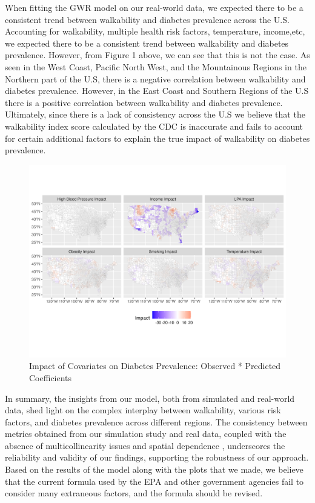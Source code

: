 \documentclass[
]{article}
\begin{document}
When fitting the GWR model on our real-world data, we expected there to
be a consistent trend between walkability and diabetes prevalence across
the U.S. Accounting for walkability, multiple health risk factors,
temperature, income,etc, we expected there to be a consistent trend
between walkability and diabetes prevalence. However, from Figure 1
above, we can see that this is not the case. As seen in the West Coast,
Pacific North West, and the Mountainous Regions in the Northern part of
the U.S, there is a negative correlation between walkability and
diabetes prevalence. However, in the East Coast and Southern Regions of
the U.S there is a positive correlation between walkability and diabetes
prevalence. Ultimately, since there is a lack of consistency across the
U.S we believe that the walkability index score calculated by the CDC is
inaccurate and fails to account for certain additional factors to
explain the true impact of walkability on diabetes prevalence.

\begin{figure}[H]

{\centering \includegraphics{facet_plot.png}

}

\caption{Impact of Covariates on Diabetes Prevalence: Observed *
Predicted Coefficients}

\end{figure}%

In summary, the insights from our model, both from simulated and
real-world data, shed light on the complex interplay between
walkability, various risk factors, and diabetes prevalence across
different regions. The consistency between metrics obtained from our
simulation study and real data, coupled with the absence of
multicollinearity issues and spatial dependence , underscores the
reliability and validity of our findings, supporting the robustness of
our approach. Based on the results of the model along with the plots
that we made, we believe that the current formula used by the EPA and
other government agencies fail to consider many extraneous factors, and
the formula should be revised.
\end{document}

